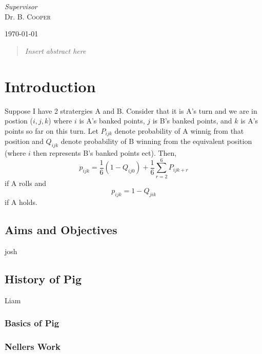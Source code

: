 \documentclass[a4paper,titlepage]{article}
\begin{document}
\begin{titlepage}
	\vfill\vfill
	\textit{Supervisor}\\
	Dr. B. \textsc{Cooper}
	
	
	\vfill\vfill\vfill
	
	{\large\today}	
	\vfill
	
	
	\newpage
	\begin{abstract}
	\textit{Insert abstract here}
	\end{abstract}
\end{titlepage}


\tableofcontents
\newpage

\section{Introduction}
Suppose I have 2 stratergies A and B. Consider that it is A's turn and we are in postion ($i,j,k$) where $i$ is A's banked points, $j$ is B's banked points, and $k$ is A's points so far on this turn. Let $P_{ijk}$ denote probability of A winnig from that position and $Q_{ijk}$ denote probability of B winning from the equivalent position (where $i$ then represents B's banked points ect). Then, \begin{equation}\label{1.1.a}
p_{ijk} = \dfrac{1}{6} (1-Q_{ij0}) + \dfrac{1}{6}\sum^{6}_{r=2}P_{ijk+r}
\end{equation}
 if A rolls and
 \begin{equation}\label{1.1.b}
 p_{ijk} = 1-Q_{jik}
 \end{equation} 
 if A holds.
\subsection{Aims and Objectives}
josh
\subsection{History of Pig}
Liam
\subsubsection{Basics of Pig}
\subsubsection{Nellers Work}
\end{document}
